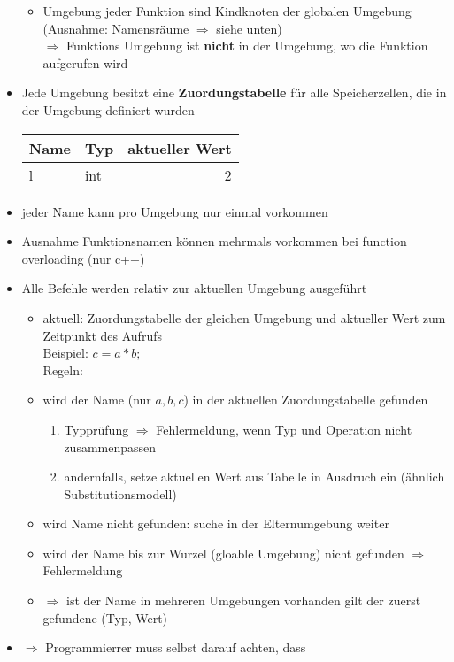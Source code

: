 \documentclass[a4paper]{scrartcl}
\begin{document}
\begin{itemize}
\begin{itemize}
\item Umgebung jeder Funktion sind Kindknoten der globalen Umgebung (Ausnahme: Namensräume $\Rightarrow$ siehe unten) \\
      $\Rightarrow$ Funktions Umgebung ist \textbf{nicht} in der Umgebung, wo die Funktion aufgerufen wird
\end{itemize}
\item Jede Umgebung besitzt eine \textbf{Zuordungstabelle} für alle Speicherzellen, die in der Umgebung definiert wurden
\begin{center}
\begin{tabular}{llr}
Name & Typ & aktueller Wert\\
\hline
l & int & 2\\
\end{tabular}
\end{center}
\item jeder Name kann pro Umgebung nur einmal vorkommen
\item Ausnahme Funktionsnamen können mehrmals vorkommen bei function overloading (nur c++)
\item Alle Befehle werden relativ zur aktuellen Umgebung ausgeführt
\begin{itemize}
\item aktuell: Zuordungstabelle der gleichen Umgebung und aktueller Wert zum Zeitpunkt des Aufrufs \\
      Beispiel: $c = a * b;$ \\
      Regeln:
\item wird der Name (nur $a, b, c$) in der aktuellen Zuordungstabelle gefunden
\begin{enumerate}
\item Typprüfung $\Rightarrow$ Fehlermeldung, wenn Typ und Operation nicht zusammenpassen
\item andernfalls, setze aktuellen Wert aus Tabelle in Ausdruch ein (ähnlich Substitutionsmodell)
\end{enumerate}
\item wird Name nicht gefunden: suche in der Elternumgebung weiter
\item wird der Name bis zur Wurzel (gloable Umgebung) nicht gefunden $\Rightarrow$ Fehlermeldung
\item $\Rightarrow$ ist der Name in mehreren Umgebungen vorhanden gilt der zuerst gefundene (Typ, Wert)
\end{itemize}
\item $\Rightarrow$ Programmierrer muss selbst darauf achten, dass

\end{itemize}
\end{document}
